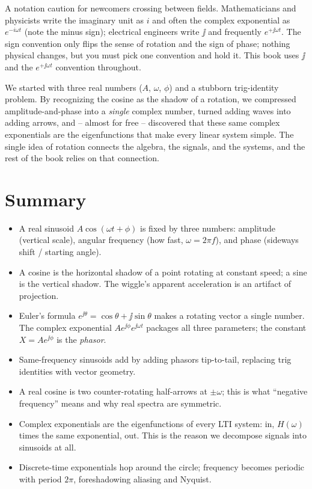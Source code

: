 \begin{marginnotebox}
A notation caution for newcomers crossing between fields. Mathematicians and physicists write the
imaginary unit as $i$ and often the complex exponential as $e^{-i\omega t}$ (note the minus sign);
electrical engineers write $\jj$ and frequently $e^{+\jj\omega t}$. The sign convention only flips
the sense of rotation and the sign of phase; nothing physical changes, but you must pick one
convention and hold it. This book uses $\jj$ and the $e^{+\jj\omega t}$ convention throughout.
\end{marginnotebox}

\begin{aestheticbox}
We started with three real numbers ($A$, $\omega$,
$\phi$) and a stubborn trig-identity problem. By recognizing the cosine as the shadow of a
rotation, we compressed amplitude-and-phase into a \emph{single} complex number, turned adding
waves into adding arrows, and -- almost for free -- discovered that these same complex
exponentials are the eigenfunctions that make every linear system simple. The single idea of
rotation connects the algebra, the signals, and the systems, and the rest of the book relies on
that connection.
\end{aestheticbox}

\section*{Summary}

\begin{itemize}
  \item A real sinusoid $A\cos(\omega t + \phi)$ is fixed by three numbers: amplitude (vertical
        scale), angular frequency (how fast, $\omega = 2\pi f$), and phase (sideways shift /
        starting angle).
  \item A cosine is the horizontal shadow of a point rotating at constant speed; a sine is the
        vertical shadow. The wiggle's apparent acceleration is an artifact of projection.
  \item Euler's formula $e^{\jj\theta} = \cos\theta + \jj\sin\theta$ makes a rotating vector a
        single number. The complex exponential $A e^{\jj\phi} e^{\jj\omega t}$ packages all three
        parameters; the constant $X = Ae^{\jj\phi}$ is the \emph{phasor}.
  \item Same-frequency sinusoids add by adding phasors tip-to-tail, replacing trig identities with
        vector geometry.
  \item A real cosine is two counter-rotating half-arrows at $\pm\omega$; this is what ``negative
        frequency'' means and why real spectra are symmetric.
  \item Complex exponentials are the eigenfunctions of every LTI system: in, $H(\omega)$ times the
        same exponential, out. This is the reason we decompose signals into sinusoids at all.
  \item Discrete-time exponentials hop around the circle; frequency becomes periodic with period
        $2\pi$, foreshadowing aliasing and Nyquist.
\end{itemize}

